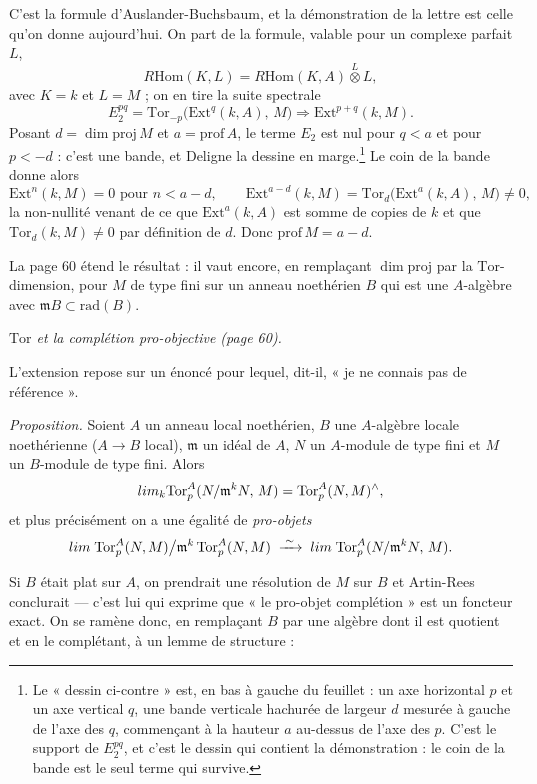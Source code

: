 \documentclass[11pt,a4paper]{article}
\begin{document}
C'est la formule d'Auslander-Buchsbaum, et la démonstration de la lettre est
celle qu'on donne aujourd'hui. On part de la formule, valable pour un complexe
parfait $L$,
\[
  R\mathrm{Hom}(K, L) = R\mathrm{Hom}(K, A) \overset{L}{\otimes} L ,
\]
avec $K = k$ et $L = M$ ; on en tire la suite spectrale
\[
  E_{2}^{pq} = \mathrm{Tor}_{-p}\bigl(\mathrm{Ext}^{q}(k, A),\, M\bigr)
  \Longrightarrow \mathrm{Ext}^{p+q}(k, M) .
\]
Posant $d = \dim\mathrm{proj}\,M$ et $a = \mathrm{prof}\,A$, le terme $E_{2}$ est
nul pour $q < a$ et pour $p < -d$ : c'est une bande, et Deligne la dessine en
marge.\footnote{Le « dessin ci-contre » est, en bas à gauche du feuillet : un
axe horizontal $p$ et un axe vertical $q$, une bande verticale hachurée de
largeur $d$ mesurée à gauche de l'axe des $q$, commençant à la hauteur $a$
au-dessus de l'axe des $p$. C'est le support de $E_{2}^{pq}$, et c'est le
dessin qui contient la démonstration : le coin de la bande est le seul terme
qui survive.} Le coin de la bande donne alors
\[
  \mathrm{Ext}^{n}(k, M) = 0 \text{ pour } n < a - d ,
  \qquad
  \mathrm{Ext}^{a-d}(k, M) = \mathrm{Tor}_{d}\bigl(\mathrm{Ext}^{a}(k, A),\,
  M\bigr) \neq 0 ,
\]
la non-nullité venant de ce que $\mathrm{Ext}^{a}(k,A)$ est somme de copies de
$k$ et que $\mathrm{Tor}_{d}(k, M) \neq 0$ par définition de $d$. Donc
$\mathrm{prof}\,M = a - d$.

La page 60 étend le résultat : il vaut encore, en remplaçant $\dim\mathrm{proj}$
par la $\mathrm{Tor}$-dimension, pour $M$ de type fini sur un anneau noethérien
$B$ qui est une $A$-algèbre avec $\mathfrak{m}B \subset \mathrm{rad}(B)$.

\emph{$\mathrm{Tor}$ et la complétion pro-objective (page 60).}

L'extension repose sur un énoncé pour lequel, dit-il, « je ne connais pas de
référence ».

\emph{Proposition.} Soient $A$ un anneau local noethérien, $B$ une $A$-algèbre
locale noethérienne ($A \to B$ local), $\mathfrak{m}$ un idéal de $A$, $N$ un
$A$-module de type fini et $M$ un $B$-module de type fini. Alors
\[
  \varprojlim_{k} \mathrm{Tor}_{p}^{A}(N/\mathfrak{m}^{k}N,\, M)
  = \mathrm{Tor}_{p}^{A}(N, M)^{\wedge} ,
\]
et plus précisément on a une égalité de \emph{pro-objets}
\[
  \varprojlim\;\mathrm{Tor}_{p}^{A}(N, M) \big/ \mathfrak{m}^{k}\,\mathrm{Tor}_{p}^{A}(N, M)
  \;\xrightarrow{\;\sim\;}\;
  \varprojlim\;\mathrm{Tor}_{p}^{A}(N/\mathfrak{m}^{k}N,\, M) .
\]

Si $B$ était plat sur $A$, on prendrait une résolution de $M$ sur $B$ et
Artin-Rees conclurait — c'est lui qui exprime que « le pro-objet complétion »
est un foncteur exact. On se ramène donc, en remplaçant $B$ par une algèbre dont
il est quotient et en le complétant, à un lemme de structure :
\end{document}
